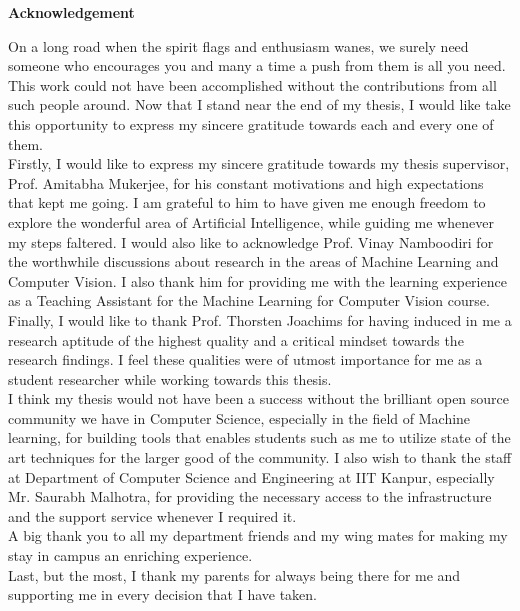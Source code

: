 \cleardoublepage

\begin{center}
	{\huge{\textbf{Acknowledgement}}}
\end{center}
On a long road when the spirit flags and enthusiasm wanes, we surely need 
someone who encourages you and many a time a push from them is all you 
need. This work could not have been accomplished without the contributions from 
all such people around. Now that I stand near the end of my thesis, I would 
like 
take this opportunity to express my sincere gratitude towards each and every one 
of them.\\

Firstly, I would like to express my sincere gratitude towards my thesis 
supervisor, 
Prof. Amitabha Mukerjee, for his constant motivations and high expectations 
that kept me going. 
I am grateful to him to have given me enough freedom to explore the wonderful 
area of Artificial Intelligence, while guiding me whenever my steps faltered. I 
would also like to acknowledge Prof. Vinay Namboodiri for the worthwhile 
discussions about research in the areas of Machine Learning and Computer 
Vision. I also thank him for providing me with the learning experience as a 
Teaching Assistant for the Machine Learning for Computer Vision course. Finally, 
I would like to thank Prof. Thorsten Joachims for having 
induced in me a research aptitude of the highest quality and a critical mindset 
towards the research findings. I feel these qualities were of utmost importance 
for me as a student researcher while working towards this thesis.\\

I think my thesis would not have been a success without the brilliant open 
source community we have in Computer Science, especially in the field of 
Machine learning, for building tools that enables students such as me to utilize 
state of the art techniques for the larger good of the community. I also 
wish to thank the staff at Department of Computer Science and Engineering at 
IIT Kanpur, especially Mr. Saurabh Malhotra, for providing the necessary 
access to the infrastructure and the support service whenever I required it.\\

A big thank you to all my department friends and my wing mates for making my 
stay in campus an enriching experience. \\

Last, but the most, I thank my parents for always being there for me and 
supporting me in every decision that I have taken.

\vskip 4mm
\begin{flushright}
\textit{\textbf{\author}}
\end{flushright}
